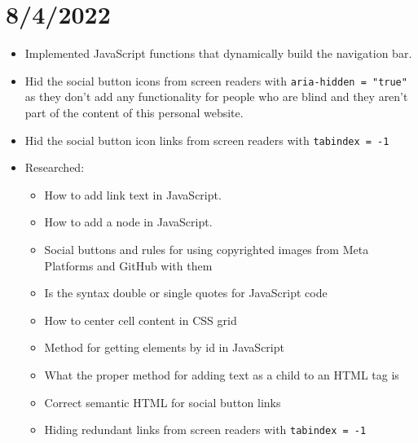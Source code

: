 \documentclass{article}
\begin{document}
\section*{8/4/2022}
\begin{itemize}
	\item Implemented JavaScript functions that dynamically build the navigation bar. 
	\item Hid the social button icons from screen readers with \texttt{aria-hidden = "true"} as they don't add any functionality for people who are blind and they aren't part of the content of this personal website.
	\item Hid the social button icon links from screen readers with \texttt{tabindex = -1}
	\item Researched:
		\begin{itemize} 
	 			\item How to add link text in JavaScript.
	 			\item How to add a node in JavaScript.
	 			\item Social buttons and rules for using copyrighted images from Meta Platforms and GitHub with them
	 			\item Is the syntax double or single quotes for JavaScript code
	 			\item How to center cell content in CSS grid
	 			\item Method for getting elements by id in JavaScript
	 			\item What the proper method for adding text as a child to an HTML tag is
	 			\item Correct semantic HTML for social button links
	 			\item Hiding redundant links from screen readers with \texttt{tabindex = -1}
		\end{itemize} 
\end{itemize}
\end{document}
